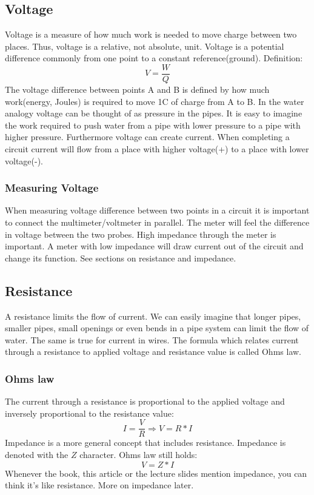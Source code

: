 \subsection{Voltage}
Voltage is a measure of how much work is needed to move charge between two 
places. Thus, voltage is a relative, not absolute, unit. Voltage is a 
potential difference commonly from one point to a constant reference(ground). 
Definition:
\begin{equation}
    V = \frac{W}{Q}
\end{equation}
The voltage difference between points A and B is defined by how much 
work(energy, Joules) is required to move 1C of charge from A to B. In the 
water analogy voltage can be thought of as pressure in the pipes. It is easy 
to imagine the work required to push water from a pipe with lower pressure to 
a pipe with higher pressure. Furthermore voltage can create current. When completing a circuit current will flow from a place with higher voltage(+) to a place with lower voltage(-).
\subsubsection{Measuring Voltage}
When measuring voltage difference between two points in a circuit it is 
important to connect the multimeter/voltmeter in parallel. The meter will feel 
the difference in voltage between the two probes. High impedance through the 
meter is important. A meter with low impedance will draw current out of the 
circuit and change its function. See sections on resistance and impedance.

\subsection{Resistance}
A resistance limits the flow of current. We can easily imagine that longer pipes, smaller pipes, small openings or even bends in a pipe system can limit the flow of water. The same is true for current in wires. The formula which 
relates current through a resistance to applied voltage and resistance value is called Ohms law.
\subsubsection{Ohms law} 
The current through a resistance is proportional to the applied voltage and inversely proportional to the resistance value:
\begin{equation} \label{eq:ohm}
    I = \frac{V}{R} \Rightarrow V = R * I
\end{equation}
Impedance is a more general concept that includes resistance. Impedance is 
denoted with the \(Z\) character. Ohms law still holds:
\begin{equation}
    V = Z * I
\end{equation}
Whenever the book, this article or the lecture slides mention impedance, you 
can think it's like resistance. More on impedance later.

